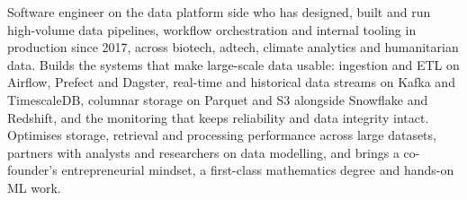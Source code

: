 
\begin{cvparagraph}

Software engineer on the data platform side who has designed, built and run high-volume data pipelines, workflow orchestration and internal tooling in production since 2017, across biotech, adtech, climate analytics and humanitarian data. Builds the systems that make large-scale data usable: ingestion and ETL on Airflow, Prefect and Dagster, real-time and historical data streams on Kafka and TimescaleDB, columnar storage on Parquet and S3 alongside Snowflake and Redshift, and the monitoring that keeps reliability and data integrity intact. Optimises storage, retrieval and processing performance across large datasets, partners with analysts and researchers on data modelling, and brings a co-founder's entrepreneurial mindset, a first-class mathematics degree and hands-on ML work.

\end{cvparagraph}
